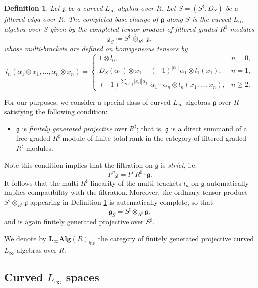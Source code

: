\documentclass[12pt]{amsart}
\newtheorem{defn}{Definition}[section]
\numberwithin{equation}{section}
\theoremstyle{plain}
\newcommand{\fg}{\mathfrak{g}}
\newcommand{\CE}{\mathrm{CE}}
\newcommand{\uR}{{R^\sharp}}
\newcommand{\uS}{{S^\sharp}}
\begin{document}
	\begin{defn}\label{bc}
		Let $\fg$ be a curved $L_\infty$ algebra over $R$. Let $S=(S^\sharp,D_S)$ be a filtered cdga over $R$. 
		The \emph{completed base change} of $\fg$ along $S$ is the curved $L_\infty$ algebra over $S$ given by the completed tensor product of filtered graded $\uR$-modules
		\[
		\fg_S\coloneqq
		\uS \,\widehat{\otimes}_\uR\, \fg,
		\]
		whose multi-brackets are defined on homogeneous tensors by
		\[
		l_n(\alpha_1 \otimes x_1,\ldots,\alpha_n \otimes x_n)
		=
		\begin{cases}
			1 \otimes l_0,
			& n=0, \\[6pt]
			D_S(\alpha_1)\otimes x_1
			+
			(-1)^{|\alpha_1|}
			\alpha_1 \otimes l_1(x_1),
			& n=1, \\[6pt]
			(-1)^{\sum_{i<j}|x_i||\alpha_j|}
			\,\alpha_1\cdots\alpha_n
			\otimes
			l_n(x_1,\ldots,x_n),
			& n\ge2.
		\end{cases}
		\]
	\end{defn}	
	
	For our purposes, we consider a special class of curved $L_\infty$ algebras $\fg$ over $R$ satisfying the following condition:
	\begin{itemize}
		\item $\fg$ is \emph{finitely generated projective} over $\uR$; that is, $\fg$ is a direct summand of a free graded $\uR$-module of finite total rank in the category of filtered graded $\uR$-modules.
	\end{itemize}
	Note this condition implies that the filtration on $\fg$ is \emph{strict}, i.e.
	\[
	F^p \fg = F^p \uR \cdot \fg.
	\]
	It follows that the multi-$\uR$-linearity of the multi-brackets $l_n$ on $\fg$ automatically implies compatibility with the filtration. Moreover, the ordinary tensor product $\uS \otimes_\uR \fg$ appearing in Definition \ref{bc} is automatically complete, so that
	\[
	\fg_S = \uS \otimes_\uR \fg,
	\]
	and is again finitely generated projective over $\uS$.
	
	We denote by $\mathbf{L_\infty Alg}(R)_{\mathrm{fgp}}$ the category of finitely generated projective curved $L_\infty$ algebras over $R$.
	
	\subsection{Curved \texorpdfstring{$L_\infty$}{L-infinity}  spaces}
	
\end{document}
